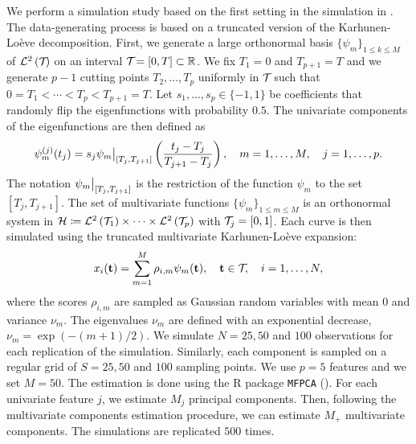 We perform a simulation study based on the first setting in the simulation in \cite{happMultivariateFunctionalPrincipal2018}. The data-generating process is based on a truncated version of the Karhunen-Loève decomposition. First, we generate a large orthonormal basis $\{\psi_m\}_{1 \leq k \leq M}$ of $\mathcal{L}^{2}\left(\mathcal{T}_{}\right)$ on an interval $\mathcal{T}_{} = [0, T] \subset \mathbb{R}$. We fix $T_1 = 0$ and $T_{p + 1} = T$ and we generate $p - 1$ cutting points $T_2, \dots, T_p$ uniformly in $\mathcal{T}_{}$ such that $0 = T_1 < \cdots < T_p < T_{p+1} = T$. Let $s_1, \dots, s_p \in \{-1, 1\}$ be coefficients that randomly flip the eigenfunctions with probability $0.5$. The univariate components of the eigenfunctions are then defined as
\begin{equation}\label{eq:simulation_uni_component}
    \psi_m^{(j)}(t_j) = s_j \restr{\psi_m}{[T_j, T_{j + 1}]}\left(\frac{t_j - T_j}{T_{j + 1} - T_j}\right), \quad m = 1, \dots, M, \quad j = 1, \dots, p.
\end{equation}
The notation $\restr{\psi_m}{[T_j, T_{j + 1}]}$ is the restriction of the function $\psi_m$ to the set $[T_j, T_{j + 1}]$. The set of multivariate functions $\{\psi_m\}_{1 \leq m \leq M}$ is an orthonormal system in $\mathcal{H} \coloneqq \mathcal{L}^{2}\left(\mathcal{T}_{1}\right) \times \dots \times \mathcal{L}^{2}\left(\mathcal{T}_{p}\right)$ with $\mathcal{T}_{j} = [0, 1]$. Each curve is then simulated using the truncated multivariate Karhunen-Loève expansion:
\begin{equation}
    x_i(\mathbf{t}) = \sum_{m = 1}^M \rho_{i, m} \psi_m(\mathbf{t}), \quad \mathbf{t} \in \mathcal{T}_{},\quad i = 1, \dots, N,
\end{equation}
where the scores $\rho_{i, m}$ are sampled as Gaussian random variables with mean $0$ and variance $\nu_m$. The eigenvalues $\nu_m$ are defined with an exponential decrease, $\nu_m = \exp(-(m + 1)/2)$. We simulate $N = 25, 50$ and $100$ observations for each replication of the simulation. Similarly, each component is sampled on a regular grid of $S = 25, 50$ and $100$ sampling points. We use $p = 5$ features and we set $M = 50$. The estimation is done using the \textsf{R} package \texttt{MFPCA} (\cite{happ-kurzObjectOrientedSoftwareFunctional2020}). For each univariate feature $j$, we estimate $M_j$ principal components. Then, following the multivariate components estimation procedure, we can estimate $M_+$ multivariate components. The simulations are replicated $500$ times.

